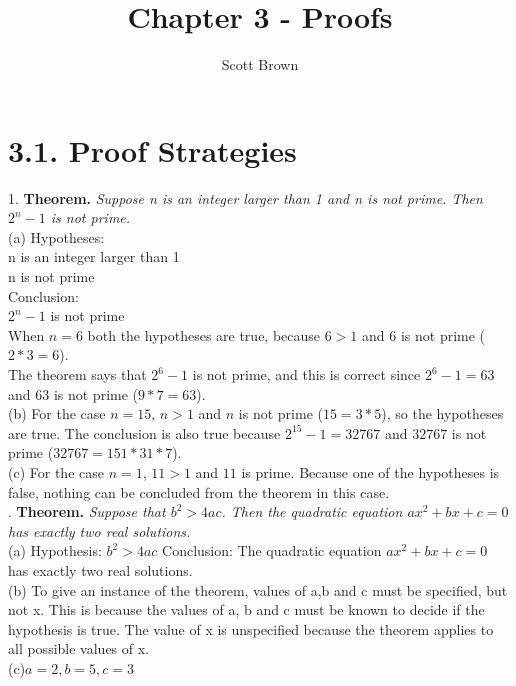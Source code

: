 \documentclass{article}
\begin{document}
\title{Chapter 3 - Proofs}
\author{Scott Brown}
\maketitle
\section*{3.1. Proof Strategies}
1. \textbf{Theorem.} \textit{Suppose n is an integer larger than 1 and n is not prime. Then $2^n - 1$ is not prime.}\\
(a) Hypotheses: \\
 n is an integer larger than 1\\
n is not prime\\
 Conclusion:\\
  $2^n - 1$ is not prime\\
  When $n = 6$ both the hypotheses are true, because $6 > 1$ and $6$ is not prime ($2*3=6$).\\ The theorem says that $2^6-1$ is not prime, and this is correct since 
  $2^6-1=63$ and $63$ is not prime ($9*7=63$).\\
  \linebreak
  (b) For the case $n = 15$, $n > 1$ and $n$ is not prime ($15 = 3*5$), so the hypotheses are true. The conclusion is also true because $2^{15}-1 = 32767$ and $32767$ is not prime ($32767 = 151 * 31 * 7$).\\
  \linebreak
  (c) For the case $n = 1$, $11 > 1$ and $11$ is prime. Because one of the hypotheses is false, nothing can be concluded from the theorem in this case.\\
  . \textbf{Theorem.} \textit{Suppose that $b^2 > 4ac$. Then the quadratic equation $ax^2 + bx + c = 0$ has exactly two real solutions.}\\
 (a) Hypothesis: $b^2 > 4ac$
     Conclusion: The quadratic equation $ax^2 + bx + c =0$ has exactly two real solutions.\\
     \linebreak
 (b) To give an instance of the theorem, values of a,b and c must be specified, but not x. This is because the values of a, b and c must be known to decide if the hypothesis is true. The value of x is unspecified because the theorem applies to all possible values of x.\\
 \linebreak
 (c)$a=2, b=5, c=3$\\
\end{document}
